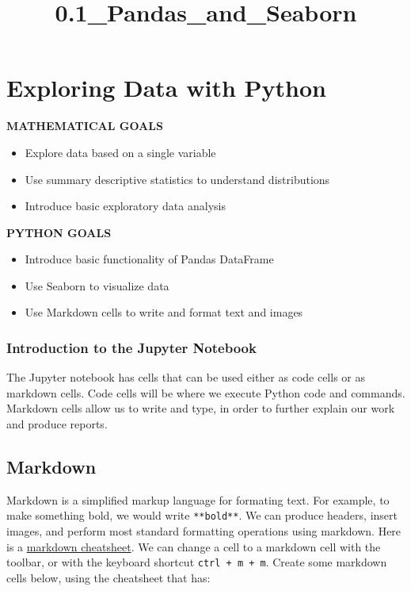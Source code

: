 \documentclass[11pt]{article}
\title{0.1\_Pandas\_and\_Seaborn}
\providecommand{\tightlist}{%
      \setlength{\itemsep}{0pt}\setlength{\parskip}{0pt}}
\begin{document}
    
    
    \maketitle
    
    

    
    \section{Exploring Data with Python}\label{exploring-data-with-python}

\textbf{MATHEMATICAL GOALS}

\begin{itemize}
\tightlist
\item
  Explore data based on a single variable
\item
  Use summary descriptive statistics to understand distributions
\item
  Introduce basic exploratory data analysis
\end{itemize}

\textbf{PYTHON GOALS}

\begin{itemize}
\tightlist
\item
  Introduce basic functionality of Pandas DataFrame
\item
  Use Seaborn to visualize data
\item
  Use Markdown cells to write and format text and images
\end{itemize}

    \subsubsection{Introduction to the Jupyter
Notebook}\label{introduction-to-the-jupyter-notebook}

The Jupyter notebook has cells that can be used either as code cells or
as markdown cells. Code cells will be where we execute Python code and
commands. Markdown cells allow us to write and type, in order to further
explain our work and produce reports.

\subsection{\texorpdfstring{\textbf{Markdown}}{Markdown}}\label{markdown}

Markdown is a simplified markup language for formating text. For
example, to make something bold, we would write \texttt{**bold**}. We
can produce headers, insert images, and perform most standard formatting
operations using markdown. Here is a
\href{https://guides.github.com/pdfs/markdown-cheatsheet-online.pdf}{markdown
cheatsheet}. We can change a cell to a markdown cell with the toolbar,
or with the keyboard shortcut \texttt{ctrl\ +\ m\ +\ m}. Create some
markdown cells below, using the cheatsheet that has:
\end{document}
